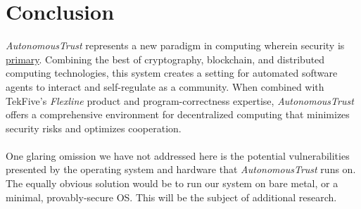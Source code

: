 \documentclass[10pt,twoside]{article}
\newcommand{\projectName}{\emph{AutonomousTrust }}
\newcommand{\analysisName}{\emph{Flexline }}
\begin{document}
\section{Conclusion}\label{sec:conclusion}

\projectName represents a new paradigm in computing wherein security is \underline{primary}.
Combining the best of cryptography, blockchain, and distributed computing technologies, this system creates a setting for automated software agents to interact and self-regulate as a community.
When combined with TekFive's \analysisName product and program-correctness expertise, \projectName offers a comprehensive environment for decentralized computing that minimizes security risks and optimizes cooperation.
\\[10pt]

\\[10pt]
One glaring omission we have not addressed here is the potential vulnerabilities presented by the operating system and hardware that \projectName runs on.
The equally obvious solution would be to run our system on bare metal, or a minimal, provably-secure OS. This will be the subject of additional research.


\end{document}
